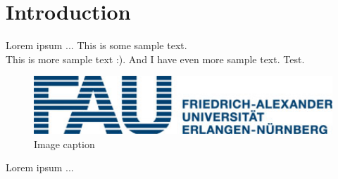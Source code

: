 \chapter{Introduction}
\label{chap:Introduction}
%
Lorem ipsum ...
This is some sample text.\\
This is more sample text :).
And I have even more sample text.
Test.
%
\begin{figure}[H]
	\centering
	\includegraphics[width=1\textwidth]{img/FAU}
	\caption{Image caption}
	\label{Image_Label}
\end{figure}
%
\noindent
%
Lorem ipsum ...
